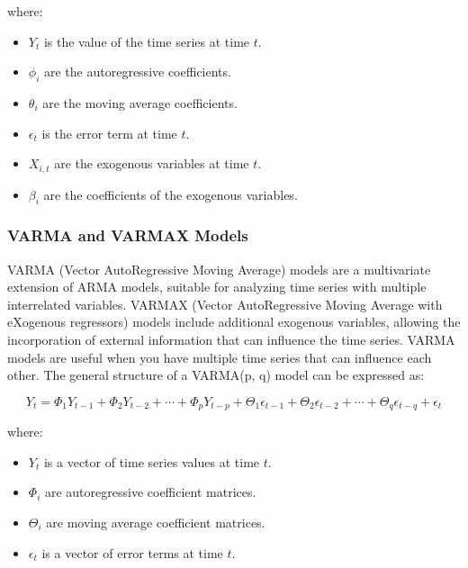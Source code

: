 where:
\begin{itemize}
    \item \( Y_t \) is the value of the time series at time \( t \).
    \item \( \phi_i \) are the autoregressive coefficients.
    \item \( \theta_i \) are the moving average coefficients.
    \item \( \epsilon_t \) is the error term at time \( t \).
    \item \( X_{i,t} \) are the exogenous variables at time \( t \).
    \item \( \beta_i \) are the coefficients of the exogenous variables.
\end{itemize}
\vspace{10pt}

\subsubsection{VARMA and VARMAX Models}

VARMA (Vector AutoRegressive Moving Average) models are a multivariate extension of ARMA models, suitable for analyzing time series with multiple interrelated variables. VARMAX (Vector AutoRegressive Moving Average with eXogenous regressors) models include additional exogenous variables, allowing the incorporation of external information that can influence the time series. VARMA models are useful when you have multiple time series that can influence each other. The general structure of a VARMA(p, q) model can be expressed as:

\begin{equation}
Y_t = \Phi_1 Y_{t-1} + \Phi_2 Y_{t-2} + \cdots + \Phi_p Y_{t-p} + \Theta_1 \epsilon_{t-1} + \Theta_2 \epsilon_{t-2} + \cdots + \Theta_q \epsilon_{t-q} + \epsilon_t
\end{equation}

where:
\begin{itemize}
    \item \( Y_t \) is a vector of time series values at time \( t \).
    \item \( \Phi_i \) are autoregressive coefficient matrices.
    \item \( \Theta_i \) are moving average coefficient matrices.
    \item \( \epsilon_t \) is a vector of error terms at time \( t \).
\end{itemize}
\vspace{10pt}

